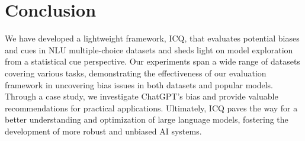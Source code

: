 \section{Conclusion}
%
%
We have developed a lightweight framework, ICQ, that evaluates potential biases and cues in NLU multiple-choice datasets and sheds light on model exploration from a statistical cue perspective. Our experiments span a wide range of datasets covering various tasks, demonstrating the effectiveness of our evaluation framework in uncovering bias issues in both datasets and popular models. Through a case study, we investigate ChatGPT's bias and provide valuable recommendations for practical applications. Ultimately, ICQ paves the way for a better understanding and optimization of large language models, fostering the development of more robust and unbiased AI systems.
